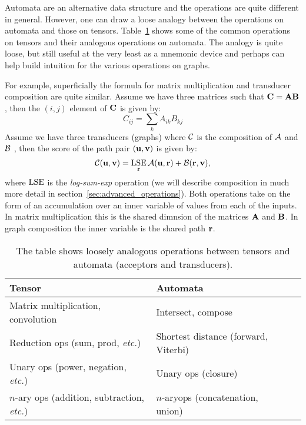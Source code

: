 \documentclass[main.tex]{subfiles}
\begin{document}
Automata are an alternative data structure and the operations are quite
different in general. However, one can draw a loose analogy between the
operations on automata and those on tensors.
Table~\ref{tab:tensor_wfst_analogy} shows some of the common operations on
tensors and their analogous operations on automata. The analogy is quite loose,
but still useful at the very least as a mnemonic device and perhaps can help
build intuition for the various operations on graphs.

For example, superficially the formula for matrix multiplication and transducer
composition are quite similar. Assume we have three matrices such that ${\bf C} = {\bf A}
{\bf B}$, then the $(i, j)$ element of ${\bf C}$ is given by:
\begin{equation}
    C_{ij} = \sum_{k} A_{ik} B_{kj}
\end{equation}
Assume we have three transducers (graphs) where $\mathcal{C}$ is the composition of
$\mathcal{A}$ and $\mathcal{B}$ , then the score of the path pair $({\bf u}, {\bf v})$ is given by:
\begin{equation}
    \mathcal{C}({\bf u}, {\bf v}) = \operatorname*{\textrm{LSE}}_{{\bf r}} \mathcal{A}({\bf u}, {\bf r}) + \mathcal{B}({\bf r}, {\bf v}),
\end{equation}
where $\operatorname*{\textrm{LSE}}$ is the \emph{log-sum-exp} operation (we will describe composition
in much more detail in section~\ref{sec:advanced_operations}). Both operations
take on the form of an accumulation over an inner variable of values from each
of the inputs. In matrix multiplication this is the shared dimnsion of the
matrices ${\bf A}$ and ${\bf B}$. In graph composition the inner variable is the shared
path ${\bf r}$.

\begin{table}[ht]
    \renewcommand{\arraystretch}{1.4}
    \caption{The table shows loosely analogous operations between tensors and
    automata (acceptors and transducers).}
    \centering
    \begin{tabular}{l l l}
    \toprule
        Tensor & Automata \\
    \midrule
        Matrix multiplication, convolution & Intersect, compose \\
        \rowcolor{Gray} Reduction ops (sum, prod, \emph{etc.}) & Shortest distance (forward, Viterbi) \\
        Unary ops (power, negation, \emph{etc.})  & Unary ops (closure) \\
        \rowcolor{Gray} $n$-ary ops (addition, subtraction, \emph{etc.})  & $n$-aryops (concatenation, union) \\
    \bottomrule
    \end{tabular}
    \label{tab:tensor_wfst_analogy}
\end{table}
\end{document}
